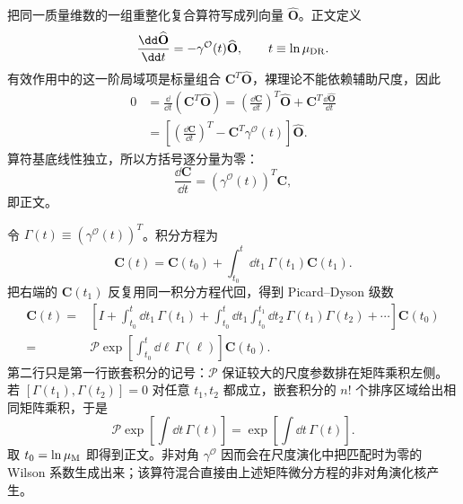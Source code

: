 \begin{derivation}
把同一质量维数的一组重整化复合算符写成列向量 $\widehat{\mathbf O}$。正文定义
\begin{equation*}
\frac{\dd\widehat{\mathbf O}}{\dd t}
=-\gamma^{\mathcal O}(t)\widehat{\mathbf O},
\qquad t\equiv\ln\mu_{\rm DR}.
\end{equation*}
有效作用中的这一阶局域项是标量组合 $\mathbf C^T\widehat{\mathbf O}$，裸理论不能依赖辅助尺度，因此
\begin{align*}
0
&=\frac{\dd}{\dd t}(\mathbf C^T\widehat{\mathbf O})
=\left(\frac{\dd\mathbf C}{\dd t}\right)^T\widehat{\mathbf O}
+\mathbf C^T\frac{\dd\widehat{\mathbf O}}{\dd t}\\
&=\left[
\left(\frac{\dd\mathbf C}{\dd t}\right)^T
-\mathbf C^T\gamma^{\mathcal O}(t)
\right]\widehat{\mathbf O}.
\end{align*}
算符基底线性独立，所以方括号逐分量为零：
\begin{equation*}
\frac{\dd\mathbf C}{\dd t}
=(\gamma^{\mathcal O}(t))^T\mathbf C,
\end{equation*}
即正文。

令 $\Gamma(t)\equiv(\gamma^{\mathcal O}(t))^T$。积分方程为
\begin{equation*}
\mathbf C(t)=\mathbf C(t_0)+\int_{t_0}^{t}\dd t_1\,\Gamma(t_1)\mathbf C(t_1).
\end{equation*}
把右端的 $\mathbf C(t_1)$ 反复用同一积分方程代回，得到 Picard--Dyson 级数
\begin{align*}
\mathbf C(t)
={}&\left[I+\int_{t_0}^{t}\dd t_1\,\Gamma(t_1)
+\int_{t_0}^{t}\dd t_1\int_{t_0}^{t_1}\dd t_2\,
\Gamma(t_1)\Gamma(t_2)+\cdots\right]\mathbf C(t_0)\\
={}&\mathcal P\exp\!\left[
\int_{t_0}^{t}\dd\ell\,\Gamma(\ell)
\right]\mathbf C(t_0).
\end{align*}
第二行只是第一行嵌套积分的记号：$\mathcal P$ 保证较大的尺度参数排在矩阵乘积左侧。若 $[\Gamma(t_1),\Gamma(t_2)]=0$ 对任意 $t_1,t_2$ 都成立，嵌套积分的 $n!$ 个排序区域给出相同矩阵乘积，于是
\begin{equation*}
\mathcal P\exp\!\left[\int\dd t\,\Gamma(t)\right]
=\exp\!\left[\int\dd t\,\Gamma(t)\right].
\end{equation*}
取 $t_0=\ln\mu_{\rm M}$ 即得到正文。非对角 $\gamma^{\mathcal O}$ 因而会在尺度演化中把匹配时为零的 Wilson 系数生成出来；该算符混合直接由上述矩阵微分方程的非对角演化核产生。
\end{derivation}

